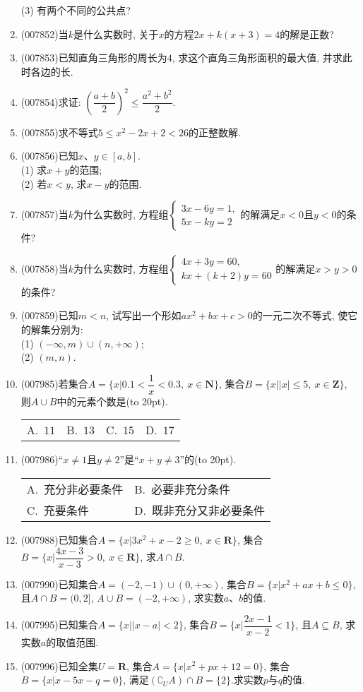 \documentclass[10pt,a4paper]{article}
\newcommand{\bracket}[1]{(\hbox to #1pt{})}
\newcommand{\twoch}[4]{\par\begin{tabular}{p{.46\textwidth}p{.46\textwidth}}
A.~#1& B.~#2\\
C.~#3& D.~#4
\end{tabular}}
\newcommand{\fourch}[4]{\par\begin{tabular}{p{.23\textwidth}p{.23\textwidth}p{.23\textwidth}p{.23\textwidth}}
A.~#1 &B.~#2& C.~#3& D.~#4
\end{tabular}}
\begin{document}
\begin{enumerate}[1.]
(3) 有两个不同的公共点?
\item {\tiny (007852)}当$k$是什么实数时, 关于$x$的方程$2x+k(x+3)=4$的解是正数?
\item {\tiny (007853)}已知直角三角形的周长为$4$, 求这个直角三角形面积的最大值, 并求此时各边的长.
\item {\tiny (007854)}求证: $(\dfrac{a+b}2)^2\le \dfrac{a^2+b^2}2$.
\item {\tiny (007855)}求不等式$5\le x^2-2x+2<26$的正整数解.
\item {\tiny (007856)}已知$x$、$y\in [a,b]$.\\
(1) 求$x+y$的范围;\\
(2) 若$x<y$, 求$x-y$的范围.
\item {\tiny (007857)}当$k$为什么实数时, 方程组$\begin{cases} 3x-6y=1, \\ 5x-ky=2 \end{cases}$的解满足$x<0$且$y<0$的条件?
\item {\tiny (007858)}当$k$为什么实数时, 方程组$\begin{cases} 4x+3y=60, \\ kx+(k+2)y=60 \end{cases}$的解满足$x>y>0$的条件?
\item {\tiny (007859)}已知$m<n$, 试写出一个形如$ax^2+bx+c>0$的一元二次不等式, 使它的解集分别为:\\
(1) $(-\infty ,m)\cup (n,+\infty)$;\\
(2) $(m,n)$.
\item {\tiny (007985)}若集合$A=\{x|0.1<\dfrac 1x<0.3,\ x\in \mathbf{N}\}$, 集合$B=\{x||x|\le 5,\ x\in \mathbf{Z}\}$, 则$A\cup B$中的元素个数是\bracket{20}.
\fourch{$11$}{$13$}{$15$}{$17$}
\item {\tiny (007986)}``$x\ne 1$且$y\ne 2$''是``$x+y\ne 3$''的\bracket{20}.
\twoch{充分非必要条件}{必要非充分条件}{充要条件}{既非充分又非必要条件}
\item {\tiny (007988)}已知集合$A=\{x|3x^2+x-2\ge 0,\  x\in \mathbf{R}\}$, 集合$B=\{x|\dfrac{4x-3}{x-3}>0,\ x\in \mathbf{R}\}$, 求$A\cap B$.
\item {\tiny (007990)}已知集合$A=(-2,-1)\cup (0,+\infty)$, 集合$B=\{x|x^2+ax+b\le 0\}$, 且$A\cap B=(0,2]$, $A\cup B=(-2,+\infty)$, 求实数$a$、$b$的值.
\item {\tiny (007995)}已知集合$A=\{x||x-a|<2\}$, 集合$B=\{x|\dfrac{2x-1}{x-2}<1\}$, 且$A\subseteq B$, 求实数$a$的取值范围.
\item {\tiny (007996)}已知全集$U=\mathbf{R}$, 集合$A=\{x|x^2+px+12=0\}$, 集合$B=\{x|x-5x-q=0\}$, 满足$(\complement _UA)\cap B=\{2\}$.求实数$p$与$q$的值.

\end{enumerate}
\end{document}
